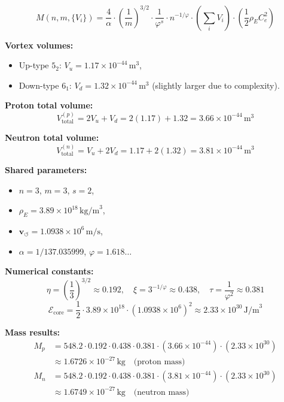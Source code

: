 \documentclass[preprint]{revtex4-2}
\begin{document}
\begin{equation}
\boxed{
M(n, m, \{V_i\}) = \frac{4}{\alpha} \cdot \left( \frac{1}{m} \right)^{3/2}
\cdot \frac{1}{\varphi^s} \cdot n^{-1/\varphi}
\cdot \left( \sum_i V_i \right)
\cdot \left( \frac{1}{2} \rho_{\scriptscriptstyle\boldsymbol\!E}C_e^2 \right)
}
\end{equation}

\textbf{Vortex volumes:}
\begin{itemize}
    \item Up-type \( 5_2 \): \( V_u = 1.17 \times 10^{-44} \, \text{m}^3 \),
    \item Down-type \( 6_1 \): \( V_d = 1.32 \times 10^{-44} \, \text{m}^3 \) (slightly larger due to complexity).
\end{itemize}

\textbf{Proton total volume:}
\[
V_\text{total}^{(p)} = 2V_u + V_d = 2(1.17) + 1.32 = 3.66 \times 10^{-44} \, \text{m}^3
\]

\textbf{Neutron total volume:}
\[
V_\text{total}^{(n)} = V_u + 2V_d = 1.17 + 2(1.32) = 3.81 \times 10^{-44} \, \text{m}^3
\]

\textbf{Shared parameters:}
\begin{itemize}
    \item \( n = 3 \), \( m = 3 \), \( s = 2 \),
    \item \( \rho_{\scriptscriptstyle\boldsymbol\!E}= 3.89 \times 10^{18} \, \text{kg/m}^3 \),
    \item \( \mathbf{v}_{\scriptscriptstyle\boldsymbol{\circlearrowleft}} = 1.0938 \times 10^6 \, \text{m/s} \),
    \item \( \alpha = 1/137.035999 \), \quad \( \varphi = 1.618\ldots \)
\end{itemize}

\textbf{Numerical constants:}
\[
\eta = \left(\frac{1}{3}\right)^{3/2} \approx 0.192, \quad
\xi = 3^{-1/\varphi} \approx 0.438, \quad
\tau = \frac{1}{\varphi^2} \approx 0.381
\]
\[
\mathcal{E}_\text{core} = \frac{1}{2} \cdot 3.89 \times 10^{18} \cdot (1.0938 \times 10^6)^2 \approx 2.33 \times 10^{30} \, \text{J/m}^3
\]

\textbf{Mass results:}
\begin{align*}
M_p &= 548.2 \cdot 0.192 \cdot 0.438 \cdot 0.381
\cdot (3.66 \times 10^{-44}) \cdot (2.33 \times 10^{30}) \\
&\approx \boxed{1.6726 \times 10^{-27} \, \text{kg}} \quad \text{(proton mass)} \\
M_n &= 548.2 \cdot 0.192 \cdot 0.438 \cdot 0.381
\cdot (3.81 \times 10^{-44}) \cdot (2.33 \times 10^{30}) \\
&\approx \boxed{1.6749 \times 10^{-27} \, \text{kg}} \quad \text{(neutron mass)}
\end{align*}
\end{document}
